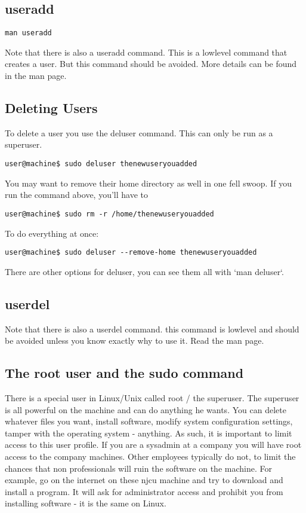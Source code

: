 \documentclass[10pt]{article}
\begin{document}
\subsection{useradd}
\begin{lstlisting}[style=term]
man useradd
\end{lstlisting}

Note that there is also a useradd command. This is a lowlevel command that creates a user. But this command should be avoided. More details can be found in the man page.


\subsection{Deleting Users}

To delete a user you use the deluser command. This can only be run as a superuser. 

\begin{lstlisting}[style=term]
user@machine$ sudo deluser thenewuseryouadded
\end{lstlisting}

You may want to remove their home directory as well in one fell swoop. If you run the command above, you'll have to 

\begin{lstlisting}[style=term]
user@machine$ sudo rm -r /home/thenewuseryouadded
\end{lstlisting}

To do everything at once:

\begin{lstlisting}[style=term]
user@machine$ sudo deluser --remove-home thenewuseryouadded
\end{lstlisting}

There are other options for deluser, you can see them all with `man deluser`.

\subsection{userdel}

Note that there is also a userdel command. 
this command is lowlevel and should be avoided unless you know exactly why to use it. Read the man page.


\subsection{ The root user and the sudo command}

There is a special user in Linux/Unix called root / the superuser. The superuser is all powerful on the machine and can do anything he wants. You can delete whatever files you want, install software, modify system configuration settings, tamper with the operating system - anything. As such, it is important to limit access to this user profile. If you are a sysadmin at a company you will have root access to the company machines. Other employees typically do not, to limit the chances that non professionals will ruin the software on the machine. For example, go on the internet on these njcu machine and try to download and install a program. It will ask for administrator access and prohibit you from installing software - it is the same on Linux.
\end{document}
